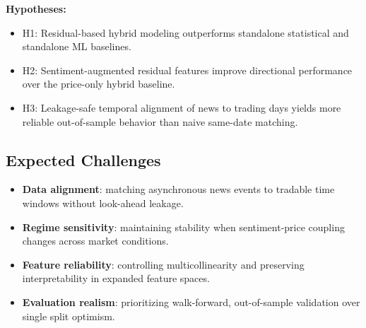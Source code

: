 \textbf{Hypotheses:}
\begin{itemize}
    \item H1: Residual-based hybrid modeling outperforms standalone statistical and standalone ML baselines.
    \item H2: Sentiment-augmented residual features improve directional performance over the price-only hybrid baseline.
    \item H3: Leakage-safe temporal alignment of news to trading days yields more reliable out-of-sample behavior than naive same-date matching.
\end{itemize}

\subsection{Expected Challenges}
\begin{itemize}
    \item \textbf{Data alignment}: matching asynchronous news events to tradable time windows without look-ahead leakage.
    \item \textbf{Regime sensitivity}: maintaining stability when sentiment-price coupling changes across market conditions.
    \item \textbf{Feature reliability}: controlling multicollinearity and preserving interpretability in expanded feature spaces.
    \item \textbf{Evaluation realism}: prioritizing walk-forward, out-of-sample validation over single split optimism.
\end{itemize}

\newpage


